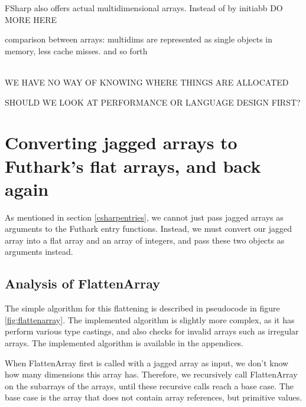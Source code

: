 FSharp also offers actual multidimensional arrays.
Instead of  by initiabb DO MORE HERE


comparison between arrays: multidims are represented as single objects in
memory, less cache misses. 
and so forth

\\

WE HAVE NO WAY OF KNOWING WHERE THINGS ARE ALLOCATED

SHOULD WE LOOK AT PERFORMANCE OR LANGUAGE DESIGN FIRST?


\section{Converting jagged arrays to Futhark's flat arrays,  and back again}
As mentioned in section \ref{csharpentries}, we cannot just pass jagged arrays
as arguments to the Futhark \csharp{} entry functions.
Instead, we must convert our jagged array into a flat array and an array of
integers, and pass these two objects as arguments instead.

\subsection{Analysis of FlattenArray}
The simple algorithm for this flattening is described in pseudocode in figure
\ref{fig:flattenarray}. The implemented algorithm is slightly more complex, as
it has perform various type castings, and also checks for invalid arrays such as
irregular arrays.
The implemented algorithm is available in the appendices.

When FlattenArray first is called with a jagged array as input, we don't know
how many dimensions this array has. Therefore, we recursively call FlattenArray
on the subarrays of the arrays, until these recursive calls reach a base case.
The base case is the array that does not contain array references, but primitive
values.

